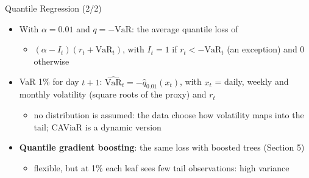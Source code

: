 \begin{frame}{Quantile Regression (2/2)}
\itemsize{\small}
\begin{itemize}
    \item With $\alpha = 0.01$ and $q = -\mathrm{VaR}$: the average quantile loss of 
    \begin{itemize}
        \item $(\alpha - I_t)(r_t + \mathrm{VaR}_t)$, with $I_t = 1$ if $r_t < -\mathrm{VaR}_t$ (an exception) and 0 otherwise
    \end{itemize}
    \item VaR 1\% for day $t + 1$: $\widehat{\mathrm{VaR}}_t = -\hat q_{0.01}(x_t)$, with $x_t$ = daily, weekly and monthly volatility (square roots of the proxy) and $r_t$
    \begin{itemize}
        \item no distribution is assumed: the data choose how volatility maps into the tail; CAViaR  is a dynamic version
    \end{itemize}
    \item \textbf{Quantile gradient boosting}: the same loss with boosted trees (Section 5)
    \begin{itemize}
        \item flexible, but at 1\% each leaf sees few tail observations: high variance
    \end{itemize}
\end{itemize}
\end{frame}

